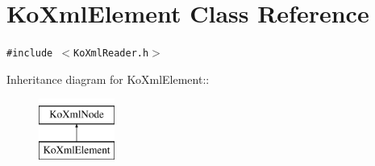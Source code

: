 \hypertarget{classKoXmlElement}{
\section{KoXmlElement Class Reference}
\label{classKoXmlElement}
}
{\tt \#include $<$KoXmlReader.h$>$}

Inheritance diagram for KoXmlElement::\begin{figure}[H]
\begin{center}
\leavevmode
\includegraphics[height=2cm]{classKoXmlElement}
\end{center}
\end{figure}
